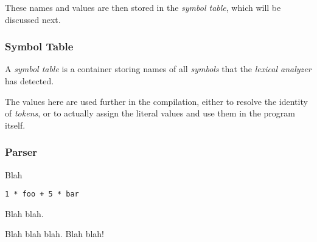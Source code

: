                 These names and values are then stored in the \emph{symbol table}, which will be discussed next.

            \subsubsection{Symbol Table}

                A \emph{symbol table} is a container storing names of all \emph{symbols} that the \emph{lexical analyzer} has detected.

                The values here are used further in the compilation, either to resolve the identity of \emph{tokens}, or to actually assign the literal values and use them in the program itself.

            \subsubsection{Parser}

                Blah

                \begin{center}
                \verb|1 * foo + 5 * bar|
                \end{center}

                Blah blah.

                \begin{center}\end{center}

                Blah blah blah. Blah blah!

